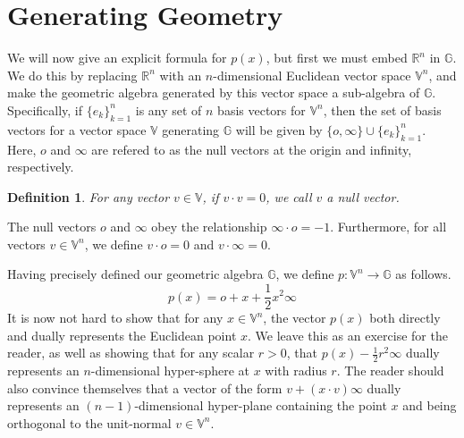 \documentclass[12pt]{article}
\newcommand{\G}{\mathbb{G}}
\newcommand{\V}{\mathbb{V}}
\newcommand{\R}{\mathbb{R}}
\newcommand{\nvao}{o}
\newcommand{\nvai}{\infty}
\newtheorem{definition}{Definition}[section]
\begin{document}
\section{Generating Geometry}

We will now give an explicit formula for $p(x)$, but first we must
embed $\R^n$ in $\G$.  We do this by replacing $\R^n$
with an $n$-dimensional Euclidean vector space $\V^n$, and
make the geometric algebra generated by this vector space
a sub-algebra of $\G$.  Specifically, if $\{e_k\}_{k=1}^n$ is
any set of $n$ basis vectors for $\V^n$, then the set of
basis vectors for a vector space $\V$ generating $\G$
will be given by $\{\nvao,\nvai\}\cup\{e_k\}_{k=1}^n$.
Here, $\nvao$ and $\nvai$ are refered to as the null vectors
at the origin and infinity, respectively.
\begin{definition}
For any vector $v\in\V$, if $v\cdot v=0$, we call $v$ a null vector.
\end{definition}
The null vectors $\nvao$ and $\nvai$ obey the relationship
$\nvai\cdot\nvao=-1$.  Furthermore, for
all vectors $v\in\V^n$, we define $v\cdot\nvao=0$ and $v\cdot\nvai=0$.

Having precisely defined our geometric algebra $\G$, we define
$p:\V^n\to\G$ as follows.
\begin{equation*}
p(x) = \nvao + x + \frac{1}{2}x^2\nvai
\end{equation*}
It is now not hard to show that for any $x\in\V^n$, the vector $p(x)$
both directly and dually represents the Euclidean point $x$.  We leave
this as an exercise
for the reader, as well as showing that for any scalar $r>0$, that
$p(x)-\frac{1}{2}r^2\nvai$ dually represents an $n$-dimensional hyper-sphere
at $x$ with radius $r$.  The reader should also convince themselves that a
vector of the form $v+(x\cdot v)\nvai$ dually represents an $(n-1)$-dimensional
hyper-plane containing the
point $x$ and being orthogonal to the unit-normal $v\in\V^n$.
\end{document}
